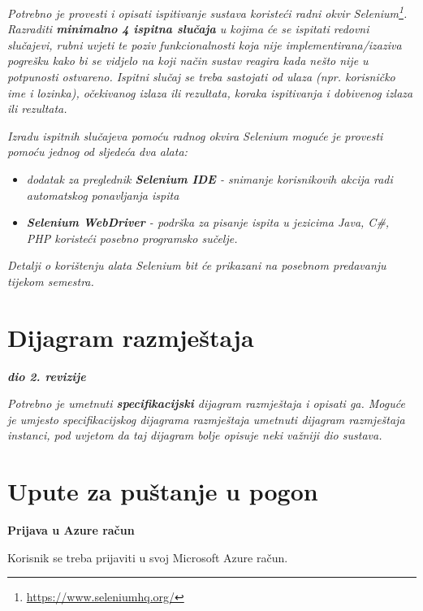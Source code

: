 	 \textit{Potrebno je provesti i opisati ispitivanje sustava koristeći radni okvir Selenium\footnote{\url{https://www.seleniumhq.org/}}. Razraditi \textbf{minimalno 4 ispitna slučaja} u kojima će se ispitati redovni slučajevi, rubni uvjeti te poziv funkcionalnosti koja nije implementirana/izaziva pogrešku kako bi se vidjelo na koji način sustav reagira kada nešto nije u potpunosti ostvareno. Ispitni slučaj se treba sastojati od ulaza (npr. korisničko ime i lozinka), očekivanog izlaza ili rezultata, koraka ispitivanja i dobivenog izlaza ili rezultata.\\ }
	 
	 \textit{Izradu ispitnih slučajeva pomoću radnog okvira Selenium moguće je provesti pomoću jednog od sljedeća dva alata:}
	 \begin{itemize}
		 \item \textit{dodatak za preglednik \textbf{Selenium IDE} - snimanje korisnikovih akcija radi automatskog ponavljanja ispita	}
		 \item \textit{\textbf{Selenium WebDriver} - podrška za pisanje ispita u jezicima Java, C\#, PHP koristeći posebno programsko sučelje.}
	 \end{itemize}
	 \textit{Detalji o korištenju alata Selenium bit će prikazani na posebnom predavanju tijekom semestra.}
	
	\eject 


\section{Dijagram razmještaja}
	
	\textbf{\textit{dio 2. revizije}}
	
	 \textit{Potrebno je umetnuti \textbf{specifikacijski} dijagram razmještaja i opisati ga. Moguće je umjesto specifikacijskog dijagrama razmještaja umetnuti dijagram razmještaja instanci, pod uvjetom da taj dijagram bolje opisuje neki važniji dio sustava.}
	
	\eject 

\section{Upute za puštanje u pogon}

		
		\textbf{Prijava u Azure račun}
		
	   \noindent Korisnik se treba prijaviti u svoj Microsoft Azure račun.
		
		\vspace{10mm}
		
